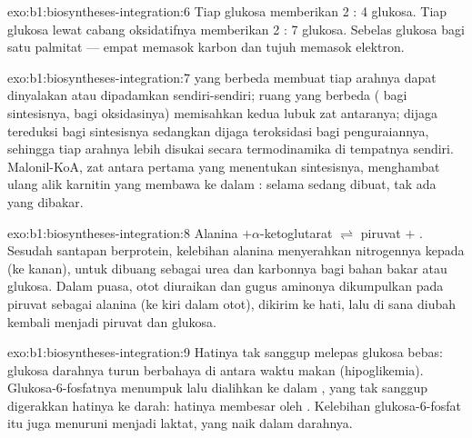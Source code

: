 \begin{solution}{exo:b1:biosyntheses-integration:6}
Tiap glukosa memberikan 2 : 4 glukosa. Tiap glukosa lewat
cabang oksidatifnya memberikan 2 : 7 glukosa. Sebelas glukosa bagi
satu palmitat --- empat memasok karbon dan tujuh memasok elektron.
\end{solution}

\begin{solution}{exo:b1:biosyntheses-integration:7}
 yang berbeda membuat tiap arahnya dapat dinyalakan atau
dipadamkan sendiri-sendiri; ruang yang berbeda ( bagi
sintesisnya,  bagi oksidasinya) memisahkan kedua lubuk zat
antaranya;  dijaga tereduksi bagi sintesisnya sedangkan  dijaga
teroksidasi bagi penguraiannya, sehingga tiap arahnya lebih disukai
secara termodinamika di tempatnya sendiri. Malonil-KoA, zat antara
pertama yang menentukan sintesisnya, menghambat ulang alik karnitin
yang membawa  ke dalam : selama  sedang
dibuat, tak ada yang dibakar.
\end{solution}

\begin{solution}{exo:b1:biosyntheses-integration:8}
Alanina $+ \alpha$-ketoglutarat $\rightleftharpoons$ piruvat $+$
. Sesudah santapan berprotein, kelebihan alanina menyerahkan
nitrogennya kepada  (ke kanan), untuk dibuang sebagai urea dan
karbonnya bagi bahan bakar atau glukosa. Dalam puasa,  otot
diuraikan dan gugus aminonya dikumpulkan pada piruvat sebagai alanina
(ke kiri dalam otot), dikirim ke hati, lalu di sana diubah kembali
menjadi piruvat dan glukosa.
\end{solution}

\begin{solution}{exo:b1:biosyntheses-integration:9}
Hatinya tak sanggup melepas glukosa bebas: glukosa darahnya turun
berbahaya di antara waktu makan (hipoglikemia). Glukosa-6-fosfatnya
menumpuk lalu dialihkan ke dalam , yang tak sanggup digerakkan
hatinya ke darah: hatinya membesar oleh . Kelebihan
glukosa-6-fosfat itu juga menuruni  menjadi laktat, yang naik
dalam darahnya.
\end{solution}

